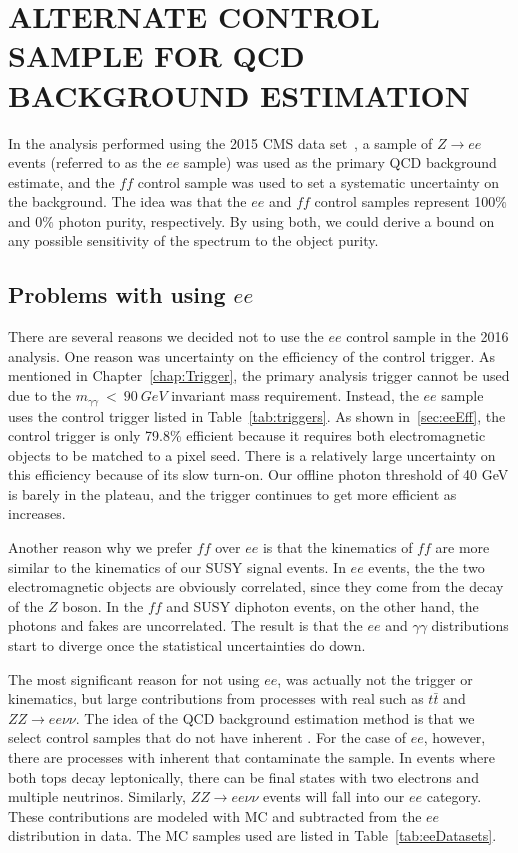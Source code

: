 \chapter{ALTERNATE CONTROL SAMPLE FOR QCD BACKGROUND ESTIMATION}
\label{app:ee}
In the analysis performed using the 2015 CMS data set~\cite{CMS:2015_anal}, 
a sample of $Z\rightarrow ee$ events (referred to as the $ee$ sample) was used as the 
primary QCD background estimate, and the $ff$ control 
sample was used to set a systematic uncertainty on the background.
The idea was that the $ee$ and $ff$ control samples represent
100$\%$ and 0$\%$ photon purity, respectively. By using both, we could
derive a bound on any possible sensitivity of the \ETmiss spectrum
to the object purity. 

\section{Problems with using $ee$}
\label{sec:eeProblems}
There are several reasons we decided not to use the $ee$ control sample
 in the 2016 analysis. One reason was uncertainty on 
 the efficiency of the control 
 trigger. As mentioned in Chapter~\ref{chap:Trigger},
the primary analysis trigger 
cannot be used due to the $m_{\gamma\gamma}~<~90~GeV$
invariant mass requirement. Instead, the $ee$ sample uses the control trigger 
listed in Table~\ref{tab:triggers}. As shown in~\ref{sec:eeEff}, the
control trigger is only 79.8\% efficient because it 
requires both electromagnetic objects to be matched to a 
pixel seed. There is a relatively 
large uncertainty on this efficiency because of its
slow turn-on. Our offline photon \pT threshold of 40 GeV is 
barely in the plateau, and the trigger continues to get more efficient 
as \pT increases. 

Another reason why we prefer $ff$ over $ee$ is that the kinematics
of $ff$ are more similar to the kinematics of our SUSY signal events.
In $ee$ events, the the two electromagnetic objects are obviously correlated, 
since they come from the decay of the $Z$ boson. In the $ff$ and SUSY diphoton
events, on the other hand, the photons and fakes are uncorrelated. The result
is that the $ee$ and $\gamma\gamma$ \ETmiss distributions start to diverge
once the statistical uncertainties do down. 

The most significant reason for not using $ee$, was actually 
not the trigger or kinematics, but large contributions from processes with real \ETmiss 
 such as $t\bar{t}$ and $ZZ\rightarrow ee\nu\nu$. 
The idea of the QCD background estimation method is that we 
select control samples that do not have inherent \ETmiss. 
For the case of $ee$, however,
there are processes with inherent \ETmiss that contaminate
the sample. 
In \ttbar events where both tops decay leptonically,
there can be final states with two electrons and
multiple neutrinos. Similarly, $ZZ \rightarrow ee\nu\nu$
events will fall into our $ee$ category.
These contributions are modeled with MC and subtracted 
from the $ee$ distribution in data. 
The MC samples used are listed in
Table~\ref{tab:eeDatasets}.


